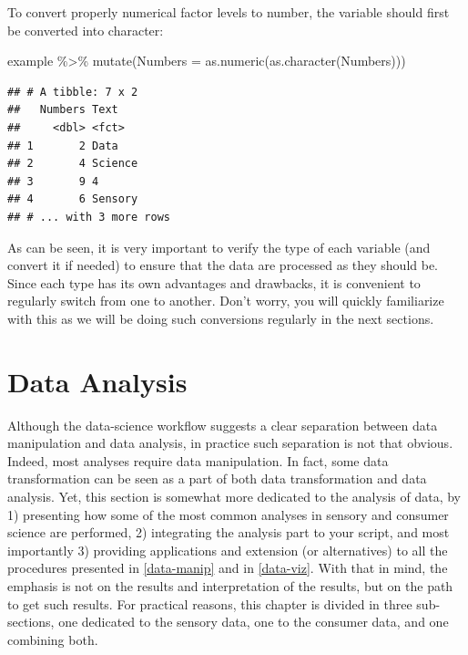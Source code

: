 \documentclass[
]{krantz}
\makeatletter
\newenvironment{Shaded}{\begin{snugshade}}{\end{snugshade}}
\newcommand{\AttributeTok}[1]{\textcolor[rgb]{0.61,0.61,0.61}{#1}}
\newcommand{\FunctionTok}[1]{\textcolor[rgb]{0,0,0}{#1}}
\newcommand{\NormalTok}[1]{#1}
\newcommand{\SpecialCharTok}[1]{\textcolor[rgb]{0,0,0}{#1}}
\renewenvironment{quote}{\begin{VF}}{\end{VF}}
\newenvironment{kframe}{%
\medskip{}
\setlength{\fboxsep}{.8em}
 \def\at@end@of@kframe{}%
 \ifinner\ifhmode%
  \def\at@end@of@kframe{\end{minipage}}%
  \begin{minipage}{\columnwidth}%
 \fi\fi%
 \def\FrameCommand##1{\hskip\@totalleftmargin \hskip-\fboxsep
 \colorbox{shadecolor}{##1}\hskip-\fboxsep
     \hskip-\linewidth \hskip-\@totalleftmargin \hskip\columnwidth}%
 \MakeFramed {\advance\hsize-\width
   \@totalleftmargin\z@ \linewidth\hsize
   \@setminipage}}%
 {\par\unskip\endMakeFramed%
 \at@end@of@kframe}
\renewenvironment{Shaded}{\begin{kframe}}{\end{kframe}}
\makeatother
\begin{document}
To convert properly numerical factor levels to number, the variable should first be converted into character:

\begin{Shaded}
\begin{Highlighting}[]
\NormalTok{example }\SpecialCharTok{\%\textgreater{}\%}
  \FunctionTok{mutate}\NormalTok{(}\AttributeTok{Numbers =} \FunctionTok{as.numeric}\NormalTok{(}\FunctionTok{as.character}\NormalTok{(Numbers)))}
\end{Highlighting}
\end{Shaded}

\begin{verbatim}
## # A tibble: 7 x 2
##   Numbers Text   
##     <dbl> <fct>  
## 1       2 Data   
## 2       4 Science
## 3       9 4      
## 4       6 Sensory
## # ... with 3 more rows
\end{verbatim}

As can be seen, it is very important to verify the type of each variable (and convert it if needed) to ensure that the data are processed as they should be. Since each type has its own advantages and drawbacks, it is convenient to regularly switch from one to another. Don't worry, you will quickly familiarize with this as we will be doing such conversions regularly in the next sections.

\hypertarget{data-analysis}{%
\chapter{Data Analysis}\label{data-analysis}}

\begin{quote}
Although the data-science workflow suggests a clear separation between data manipulation and data analysis, in practice such separation is not that obvious. Indeed, most analyses require data manipulation. In fact, some data transformation can be seen as a part of both data transformation and data analysis. Yet, this section is somewhat more dedicated to the analysis of data, by 1) presenting how some of the most common analyses in sensory and consumer science are performed, 2) integrating the analysis part to your script, and most importantly 3) providing applications and extension (or alternatives) to all the procedures presented in \ref{data-manip} and in \ref{data-viz}. With that in mind, the emphasis is not on the results and interpretation of the results, but on the path to get such results.
For practical reasons, this chapter is divided in three sub-sections, one dedicated to the sensory data, one to the consumer data, and one combining both.
\end{quote}
\end{document}
